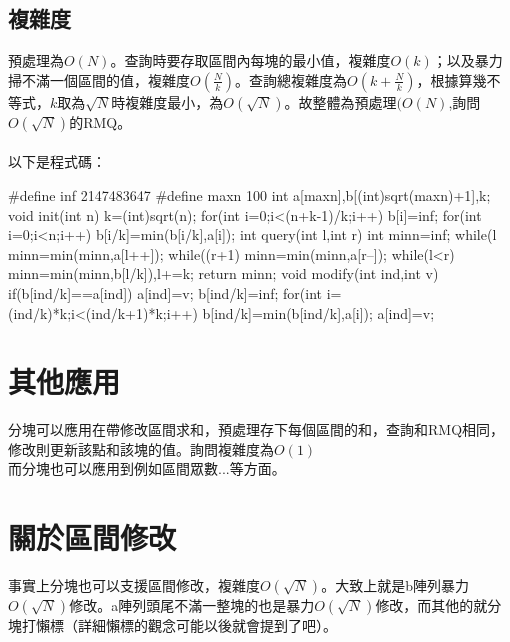 \subsection{複雜度}
預處理為$O(N)$。查詢時要存取區間內每塊的最小值，複雜度$O(k)$；以及暴力掃不滿一個區間的值，複雜度$O(\frac{N}{k})$。查詢總複雜度為$O(k+\frac{N}{k})$，根據算幾不等式，$k$取為$\sqrt{N}$時複雜度最小，為$O(\sqrt{N})$。故整體為預處理$(O(N)$,詢問$O(\sqrt{N})$的RMQ。
\\\\
以下是程式碼：
\begin{C++}
#define inf 2147483647
#define maxn 100
int a[maxn],b[(int)sqrt(maxn)+1],k;
void init(int n){
    k=(int)sqrt(n);
    for(int i=0;i<(n+k-1)/k;i++)
        b[i]=inf;
    for(int i=0;i<n;i++)
        b[i/k]=min(b[i/k],a[i]);
}
int query(int l,int r){
    int minn=inf;
    while(l%
        minn=min(minn,a[l++]);
    while((r+1)%
        minn=min(minn,a[r--]);
    while(l<r)
        minn=min(minn,b[l/k]),l+=k;
    return minn;
}
void modify(int ind,int v){
    if(b[ind/k]==a[ind]){
        a[ind]=v;
        b[ind/k]=inf;
        for(int i=(ind/k)*k;i<(ind/k+1)*k;i++)
            b[ind/k]=min(b[ind/k],a[i]);
    }
    a[ind]=v;
}
\end{C++}
\section{其他應用}
分塊可以應用在帶修改區間求和，預處理存下每個區間的和，查詢和RMQ相同，修改則更新該點和該塊的值。詢問複雜度為$O(1)$
\\
而分塊也可以應用到例如區間眾數...等方面。
\section{關於區間修改}
事實上分塊也可以支援區間修改，複雜度$O(\sqrt{N})$。大致上就是b陣列暴力$O(\sqrt{N})$修改。a陣列頭尾不滿一整塊的也是暴力$O(\sqrt{N})$修改，而其他的就分塊打懶標（詳細懶標的觀念可能以後就會提到了吧）。